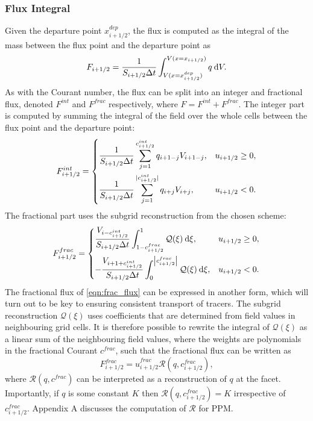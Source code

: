 \documentclass{ametsocV6.1}
\newcommand{\dx}[1]{\hspace{0.75mm}\mathrm{d}{#1}}
\begin{document}
\subsubsection{Flux Integral} \label{sec:ffsl_flux_integral}

Given the departure point $x^{dep}_{i+1/2}$, the flux is computed as the integral of the mass between the flux point and the departure point as
\begin{equation}
F_{i+1/2} = 
\frac{1}{S_{i+1/2}\Delta{t}} \int^{V(x=x_{i+1/2})}_{V(x=x^{dep}_{i+1/2})} q \dx{V}.  
\end{equation}
As with the Courant number, the flux can be split into an integer and fractional flux, denoted $F^{int}$ and $F^{frac}$ respectively, where $F = F^{int} + F^{frac}$.
The integer part is computed by summing the integral of the field over the whole cells between the flux point and the departure point:
\begin{equation}
    F^{int}_{i+1/2} = 
    \begin{dcases}
        \frac{1}{S_{i+1/2}\Delta{t}}\sum_{j=1}^{c_{i+1/2}^{int}} q_{i+1-j} V_{i+1-j}, & u_{i+1/2} \geq 0, \\
        \frac{1}{S_{i+1/2}\Delta{t}}\sum_{j=1}^{|c_{i+1/2}^{int}|} q_{i+j} V_{i+j}, & u_{i+1/2} < 0.
    \end{dcases}
\end{equation}
The fractional part uses the subgrid reconstruction from the chosen scheme:
\begin{equation} \label{eqn:frac_flux}
    F^{frac}_{i+1/2} = 
    \begin{dcases}
        \frac{V_{i-c^{int}_{i+1/2}}}{S_{i+1/2}\Delta t} \int^{1}_{1-c_{i+1/2}^{frac}} \mathcal{Q}(\xi) \dx{\xi}, & u_{i+1/2} \ge 0, \\
        -\frac{V_{i+1+c^{int}_{i+1/2}}}{S_{i+1/2}\Delta t} \int^{\left| c_{i+1/2}^{frac}\right|}_{0} \mathcal{Q}(\xi) \dx{\xi}, & u_{i+1/2} < 0.  
    \end{dcases}
\end{equation}
The fractional flux of \eqref{eqn:frac_flux} can be expressed in another form, which will turn out to be key to ensuring consistent transport of tracers. 
The subgrid reconstruction $\mathcal{Q}(\xi)$ uses coefficients that are determined from field values in neighbouring grid cells.
It is therefore possible to rewrite the integral of $\mathcal{Q}(\xi)$ as a linear sum of the neighbouring field values, where the weights are polynomials in the fractional Courant $c^{frac}$, such that the fractional flux can be written as
\begin{equation} \label{eqn:consistent_flux}
F_{i+1/2}^{frac} = \widehat{u}_{i+1/2}^{frac} \mathcal{R}(q,c_{i+1/2}^{frac}),
\end{equation}
where $\mathcal{R}(q,c^{frac})$ can be interpreted as a reconstruction of $q$ at the facet.
Importantly, if $q$ is some constant $K$ then $\mathcal{R}(q,c_{i+1/2}^{frac})=K$ irrespective of $c_{i+1/2}^{frac}$.
Appendix A discusses the computation of $\mathcal{R}$ for PPM.
\end{document}
